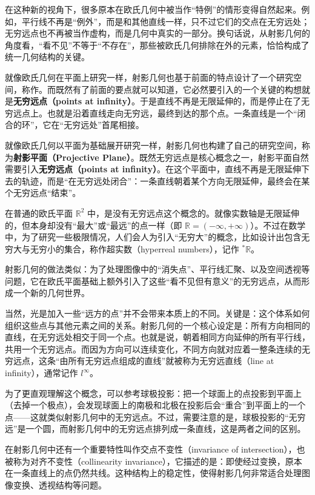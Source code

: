 在这种新的视角下，很多原本在欧氏几何中被当作“特例”的情形变得自然起来。例如，平行线不再是“例外”，而是和其他直线一样，只不过它们的交点在无穷远处；无穷远点也不再被当作虚构，而是几何中真实的一部分。换句话说，从射影几何的角度看，“看不见”不等于“不存在”，那些被欧氏几何排除在外的元素，恰恰构成了统一几何结构的关键。

就像欧氏几何在平面上研究一样，射影几何也基于前面的特点设计了一个研究空间，称作。而既然有了前面的要点就可以知道，它必然要引入的一个关键的构想就是\textbf{无穷远点（points at infinity）}。于是直线不再是无限延伸的，而是停止在了无穷远点上。也就是沿着直线走向无穷远，最终到达的那个点。一条直线是一个“闭合的环”，它在“无穷远处”首尾相接。

就像欧氏几何以平面为基础展开研究一样，射影几何也构建了自己的研究空间，称为\textbf{射影平面（Projective Plane）}。既然无穷远点是核心概念之一，射影平面自然需要引入\textbf{无穷远点（points at infinity）}。在这个平面中，直线不再是无限延伸下去的轨迹，而是“在无穷远处闭合”：一条直线朝着某个方向无限延伸，最终会在某个无穷远点“结束”。

在普通的欧氏平面 $\mathbb{R}^2$ 中，是没有无穷远点这个概念的。就像实数轴是无限延伸的，但本身却没有“最大”或“最远”的点一样（即 $\mathbb{R} = (-\infty, +\infty)$）。不过在数学中，为了研究一些极限情况，人们会人为引入“无穷大”的概念，比如设计出包含无穷大与无穷小的集合，称作超实数（hyperreal numbers），记作 $^*\mathbb{R}$。

射影几何的做法类似：为了处理图像中的“消失点”、平行线汇聚、以及空间透视等问题，它在欧氏平面基础上额外引入了这些“看不见但有意义”的无穷远点，从而形成一个新的几何世界。

当然，光是加入一些“远方的点”并不会带来本质上的不同。关键是：这个体系如何组织这些点与其他元素之间的关系。射影几何的一个核心设定是：所有方向相同的直线，在无穷远处相交于同一个点。也就是说，朝着相同方向延伸的所有平行线，共用一个无穷远点。而因为方向可以连续变化，不同方向就对应着一整条连续的无穷远点，这条“由所有无穷远点组成的直线”就被称为无穷远直线（line at infinity），通常记作 $l^\infty$。

为了更直观理解这个概念，可以参考球极投影：把一个球面上的点投影到平面上（去掉一个极点），会发现球面上的南极和北极在投影后会“重合”到平面上的一个点——这就类似射影几何中的无穷远点。不过，需要注意的是，球极投影的“无穷远”是一个圆，而射影几何中的无穷远点排列成一条直线，这是两者之间的区别。

在射影几何中还有一个重要特性叫作交点不变性（invariance of intersection），也被称为对齐不变性（collinearity invariance），它描述的是：即使经过变换，原本在一条直线上的点仍然共线。这种结构上的稳定性，使得射影几何非常适合处理图像变换、透视结构等问题。


